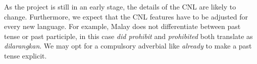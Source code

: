 \documentclass[11pt]{article}
\begin{document}



\noindent As the project is still in an early stage, the details of the CNL are likely to change. Furthermore, we expect that the CNL features have to be adjusted for every new language. For example, Malay does not differentiate between past tense or past participle, in this case \textit{did prohibit} and \textit{prohibited} both translate as \textit{dilarangkan}. We may opt for a compulsory adverbial like {\it already} to make a past tense explicit.




\end{document}
